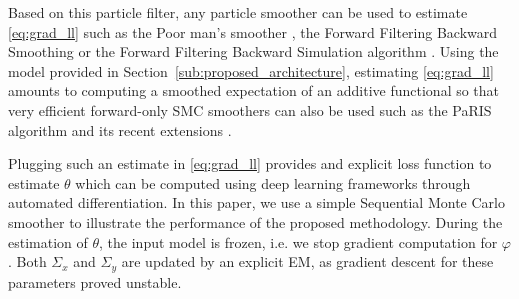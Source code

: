 \documentclass{article}
\begin{document}
Based on this particle filter, any particle smoother can be used to estimate \eqref{eq:grad_ll} such as the Poor man's smoother \cite{}, the Forward Filtering Backward Smoothing \cite{} or the Forward Filtering Backward Simulation algorithm \cite{}. Using the model provided in Section~\ref{sub:proposed_architecture}, estimating \eqref{eq:grad_ll} amounts to computing a smoothed expectation of an additive functional so that very efficient forward-only SMC smoothers can also be used such as the PaRIS algorithm \cite{} and its recent extensions \cite{}.

Plugging such an estimate in \ref{eq:grad_ll} provides and explicit loss function to estimate $\theta$ which can be computed using deep learning frameworks through automated differentiation. In this paper, we use a simple Sequential Monte Carlo smoother to illustrate the performance of the proposed methodology. %
During the estimation of $\theta$, the input model is frozen, i.e. we stop gradient computation for $\varphi$. Both $\Sigma_x$ and $\Sigma_y$ are updated by an explicit EM, as gradient descent for these parameters proved unstable.
\end{document}
